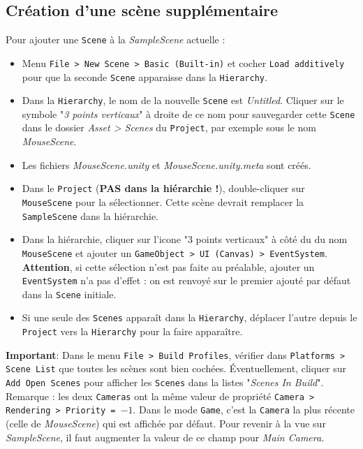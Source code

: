 \documentclass[a4paper,10pt]{article}
\newenvironment{solution}%
{\begin{tcolorbox}[breakable,colback=red!5!white,colframe=red!75!black,title=Solution]}%
{\end{tcolorbox}}
\begin{document}
\ifversionenseignant
\begin{solution}
\subsection{Création d'une scène supplémentaire}
	
Pour ajouter une \texttt{Scene} à la \textit{SampleScene} actuelle :
\begin{itemize}
	\item Menu \texttt{File > New Scene > Basic (Built-in)} et cocher \texttt{Load additively} pour que la seconde \texttt{Scene} apparaisse dans la \texttt{Hierarchy}.
	\item Dans la \texttt{Hierarchy}, le nom de la nouvelle \texttt{Scene} est \textit{Untitled}. Cliquer sur le symbole "\textit{3 points verticaux}" à droite de ce nom pour sauvegarder cette \texttt{Scene} dans le dossier \textit{Asset > Scenes} du \texttt{Project}, par exemple sous le nom \textit{MouseScene}.
	\item[$\rightarrow$] Les fichiers \textit{MouseScene.unity} et \textit{MouseScene.unity.meta} sont créés.
	\item Dans le \texttt{Project} (\textbf{PAS dans la hiérarchie !}), double-cliquer sur \texttt{MouseScene} pour la sélectionner. Cette scène devrait remplacer la \texttt{SampleScene} dans la hiérarchie.
	
	\item Dans la hiérarchie, cliquer sur l'icone "3 points verticaux" à côté du du nom \texttt{MouseScene} et ajouter un \texttt{GameObject > UI (Canvas) > EventSystem}. \textbf{Attention}, si cette sélection n'est pas faite au préalable, ajouter un \texttt{EventSystem} n'a pas d'effet : on est renvoyé sur le premier ajouté par défaut dans la \texttt{Scene} initiale.
	\item Si une seule des \texttt{Scenes} apparaît dans la \texttt{Hierarchy}, déplacer l'autre depuis le \texttt{Project} vers la \texttt{Hierarchy} pour la faire apparaître.
\end{itemize}	
		
\textbf{Important}: Dans le menu \texttt{File > Build Profiles}, vérifier dans \texttt{Platforms > Scene List} que toutes les scènes sont bien cochées. Éventuellement, cliquer sur \texttt{Add Open Scenes} pour afficher les \texttt{Scenes} dans la listes "\textit{Scenes In Build}".\\

Remarque : les deux \texttt{Cameras} ont la même valeur de propriété \texttt{Camera > Rendering > Priority = $-1$}. Dans le mode \texttt{Game}, c'est la \texttt{Camera} la plus récente (celle de \textit{MouseScene}) qui est affichée par défaut. Pour revenir à la vue sur \textit{SampleScene}, il faut augmenter la valeur de ce champ pour \textit{Main Camera}.


\end{solution}
\end{document}
